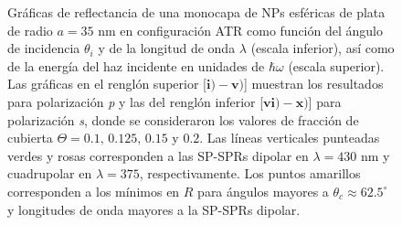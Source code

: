 \begin{figure}[h!]\centering
{}\vspace*{-.5em}
	\caption{Gráficas de reflectancia de una monocapa de NPs esféricas de plata de radio $a=35$ nm en configuración ATR como función del ángulo de incidencia $\theta_i$ y de la longitud de onda $\lambda$ (escala inferior), así como de la energía del haz incidente en unidades de $\hbar\omega$ (escala superior).  Las gráficas   en el renglón superior [$\mathbf{i)-v)}$] muestran los resultados para  polarización \emph{p} y las del renglón inferior  [$\mathbf{vi)-x)}$]  para polarización  \emph{s}, donde se consideraron los valores de fracción de cubierta $\Theta = 0.1,\,0.125,\,0.15$ y $0.2$.  Las líneas verticales punteadas verdes y rosas corresponden a las SP-SPRs dipolar en $\lambda=430$ nm y  cuadrupolar en $\lambda=375$, respectivamente.  Los puntos amarillos corresponden a los mínimos en $R$ para ángulos mayores a $\theta_c\approx 62.5^\circ$ y longitudes de onda mayores a la SP-SPRs dipolar.
}	\label{fig:Ag-R-Theta}	
	\end{figure}	

